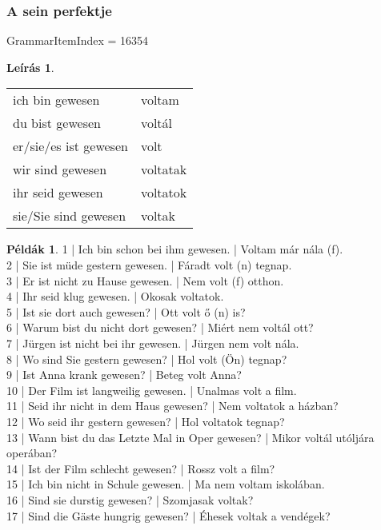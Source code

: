 \documentclass{article}
\theoremstyle{definition}
\newtheorem*{exmp}{Példák}
\newtheorem*{desc}{Leírás}
\begin{document}
\subsubsection{A sein perfektje}

GrammarItemIndex = 16354

\begin{desc}
\begin{tabular}{ll}
ich bin gewesen & voltam\\
du bist gewesen & voltál\\
er/sie/es ist gewesen & volt\\
wir sind gewesen & voltatak\\
ihr seid gewesen & voltatok\\
sie/Sie sind gewesen & voltak\\
\end{tabular}
\end{desc}

\begin{exmp}
1 | Ich bin schon bei ihm gewesen. | Voltam már nála (f).\\
2 | Sie ist müde gestern gewesen. | Fáradt volt (n) tegnap.\\
3 | Er ist nicht zu Hause gewesen. | Nem volt (f) otthon.\\
4 | Ihr seid klug gewesen. | Okosak voltatok.\\
5 | Ist sie dort auch gewesen? | Ott volt ő (n) is?\\
6 | Warum bist du nicht dort gewesen? | Miért nem voltál ott?\\
7 | Jürgen ist nicht bei ihr gewesen. | Jürgen nem volt nála.\\
8 | Wo sind Sie gestern gewesen? | Hol volt (Ön) tegnap?\\
9 | Ist Anna krank gewesen? | Beteg volt Anna?\\
10 | Der Film ist langweilig gewesen. | Unalmas volt a film.\\
11 | Seid ihr nicht in dem Haus gewesen? | Nem voltatok a házban?\\
12 | Wo seid ihr gestern gewesen? | Hol voltatok tegnap?\\
13 | Wann bist du das Letzte Mal in Oper gewesen? | Mikor voltál utóljára operában?\\
14 | Ist der Film schlecht gewesen? | Rossz volt a film?\\
15 | Ich bin nicht in Schule gewesen. | Ma nem voltam iskolában.\\
16 | Sind sie durstig gewesen? | Szomjasak voltak?\\
17 | Sind die Gäste hungrig gewesen? | Éhesek voltak a vendégek?\\
\end{exmp}
\end{document}
